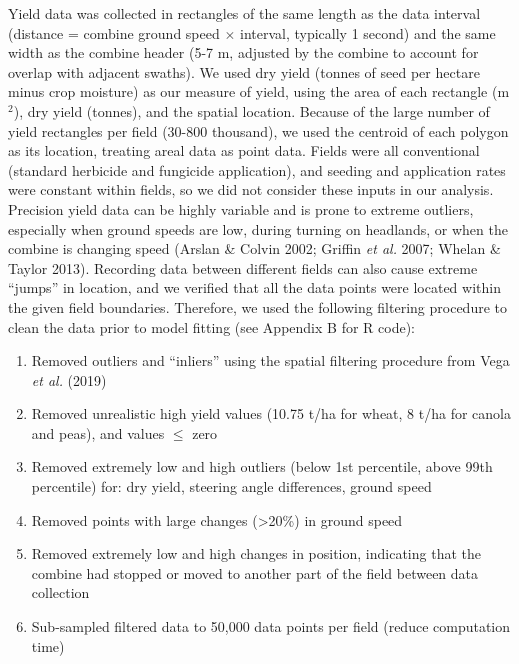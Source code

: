 \documentclass[]{elsarticle} %
\providecommand{\tightlist}{%
  \setlength{\itemsep}{0pt}\setlength{\parskip}{0pt}}
\begin{document}
Yield data was collected in rectangles of the same length as the data interval (distance = combine ground speed \(\times\) interval, typically 1 second) and the same width as the combine header (5-7 m, adjusted by the combine to account for overlap with adjacent swaths).
We used dry yield (tonnes of seed per hectare minus crop moisture) as our measure of yield, using the area of each rectangle (m\(^2\)), dry yield (tonnes), and the spatial location.
Because of the large number of yield rectangles per field (30-800 thousand), we used the centroid of each polygon as its location, treating areal data as point data.
Fields were all conventional (standard herbicide and fungicide application), and seeding and application rates were constant within fields, so we did not consider these inputs in our analysis.
Precision yield data can be highly variable and is prone to extreme outliers, especially when ground speeds are low, during turning on headlands, or when the combine is changing speed (Arslan \& Colvin 2002; Griffin \emph{et al.} 2007; Whelan \& Taylor 2013).
Recording data between different fields can also cause extreme ``jumps'' in location, and we verified that all the data points were located within the given field boundaries.
Therefore, we used the following filtering procedure to clean the data prior to model fitting (see Appendix B for R code):

\begin{enumerate}
\def\labelenumi{\arabic{enumi}.}
\tightlist
\item Removed outliers and ``inliers'' using the spatial filtering procedure from Vega \emph{et al.} (2019)
\item Removed unrealistic high yield values (10.75 t/ha for wheat, 8 t/ha for canola and peas), and values $\leq$ zero 
\item Removed extremely low and high outliers (below 1st percentile, above 99th percentile) for: dry yield, steering angle differences, ground speed
\item Removed points with large changes (\textgreater20\%) in ground speed
\item Removed extremely low and high changes in position, indicating that the combine had stopped or moved to another part of the field between data collection
\item Sub-sampled filtered data to 50,000 data points per field (reduce computation time)
\end{enumerate}
\end{document}
